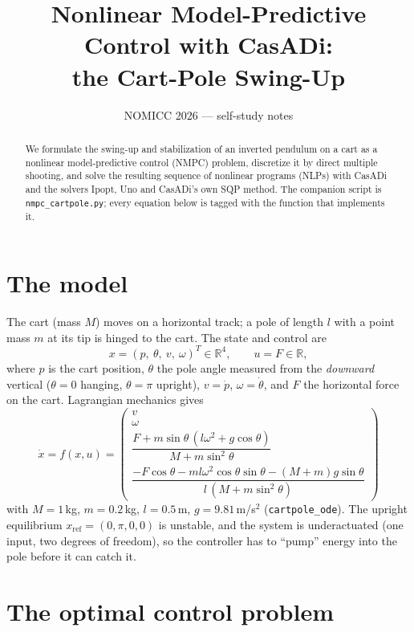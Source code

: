 \documentclass[11pt]{article}
\title{Nonlinear Model-Predictive Control with CasADi:\\ the Cart-Pole Swing-Up}
\author{NOMICC 2026 --- self-study notes}
\date{}
\newcommand{\R}{\mathbb{R}}
\newcommand{\xref}{x_{\mathrm{ref}}}
\begin{document}
\maketitle

\begin{abstract}
We formulate the swing-up and stabilization of an inverted pendulum on a cart as a
nonlinear model-predictive control (NMPC) problem, discretize it by direct multiple
shooting, and solve the resulting sequence of nonlinear programs (NLPs) with CasADi
and the solvers Ipopt, Uno and CasADi's own SQP method.
The companion script is \texttt{nmpc\_cartpole.py}; every equation below is tagged
with the function that implements it.
\end{abstract}

\section{The model}\label{sec:model}

The cart (mass $M$) moves on a horizontal track; a pole of length $l$ with a point
mass $m$ at its tip is hinged to the cart. The state and control are
\[
  x = (p,\ \theta,\ v,\ \omega)^T \in \R^4, \qquad u = F \in \R,
\]
where $p$ is the cart position, $\theta$ the pole angle measured from the
\emph{downward} vertical ($\theta=0$ hanging, $\theta=\pi$ upright), $v=\dot p$,
$\omega=\dot\theta$, and $F$ the horizontal force on the cart. Lagrangian mechanics gives
\begin{equation}\label{eq:ode}
  \dot x = f(x,u) =
  \begin{pmatrix}
    v \\ \omega \\[2pt]
    \dfrac{F + m \sin\theta\,(l\omega^2 + g\cos\theta)}{M + m\sin^2\theta} \\[10pt]
    \dfrac{-F\cos\theta - m l \omega^2 \cos\theta\sin\theta - (M+m) g \sin\theta}{l\,(M + m\sin^2\theta)}
  \end{pmatrix}
\end{equation}
with $M=1$\,kg, $m=0.2$\,kg, $l=0.5$\,m, $g=9.81$\,m/s$^2$
(\texttt{cartpole\_ode}). The upright equilibrium $\xref=(0,\pi,0,0)$ is unstable,
and the system is underactuated (one input, two degrees of freedom), so the controller
has to ``pump'' energy into the pole before it can catch it.

\section{The optimal control problem}
\end{document}
